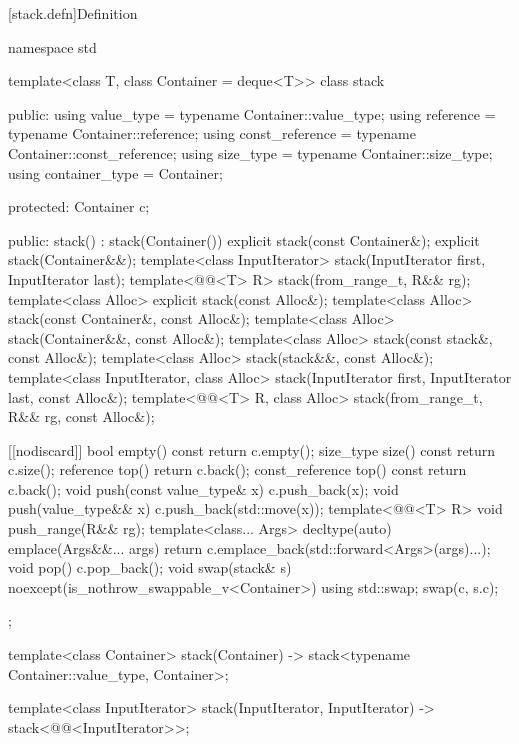 [stack.defn]{Definition}

\begin{codeblock}
namespace std {
  template<class T, class Container = deque<T>>
  class stack {
  public:
    using value_type      = typename Container::value_type;
    using reference       = typename Container::reference;
    using const_reference = typename Container::const_reference;
    using size_type       = typename Container::size_type;
    using container_type  = Container;

  protected:
    Container c;

  public:
    stack() : stack(Container()) {}
    explicit stack(const Container&);
    explicit stack(Container&&);
    template<class InputIterator> stack(InputIterator first, InputIterator last);
    template<@@<T> R> stack(from_range_t, R&& rg);
    template<class Alloc> explicit stack(const Alloc&);
    template<class Alloc> stack(const Container&, const Alloc&);
    template<class Alloc> stack(Container&&, const Alloc&);
    template<class Alloc> stack(const stack&, const Alloc&);
    template<class Alloc> stack(stack&&, const Alloc&);
    template<class InputIterator, class Alloc>
      stack(InputIterator first, InputIterator last, const Alloc&);
    template<@@<T> R, class Alloc>
      stack(from_range_t, R&& rg, const Alloc&);

    [[nodiscard]] bool empty() const    { return c.empty(); }
    size_type size()  const             { return c.size(); }
    reference         top()             { return c.back(); }
    const_reference   top() const       { return c.back(); }
    void push(const value_type& x)      { c.push_back(x); }
    void push(value_type&& x)           { c.push_back(std::move(x)); }
    template<@@<T> R>
      void push_range(R&& rg);
    template<class... Args>
      decltype(auto) emplace(Args&&... args)
        { return c.emplace_back(std::forward<Args>(args)...); }
    void pop()                          { c.pop_back(); }
    void swap(stack& s) noexcept(is_nothrow_swappable_v<Container>)
      { using std::swap; swap(c, s.c); }
  };

  template<class Container>
    stack(Container) -> stack<typename Container::value_type, Container>;

  template<class InputIterator>
    stack(InputIterator, InputIterator) -> stack<@@<InputIterator>>;

}
\end{codeblock}
